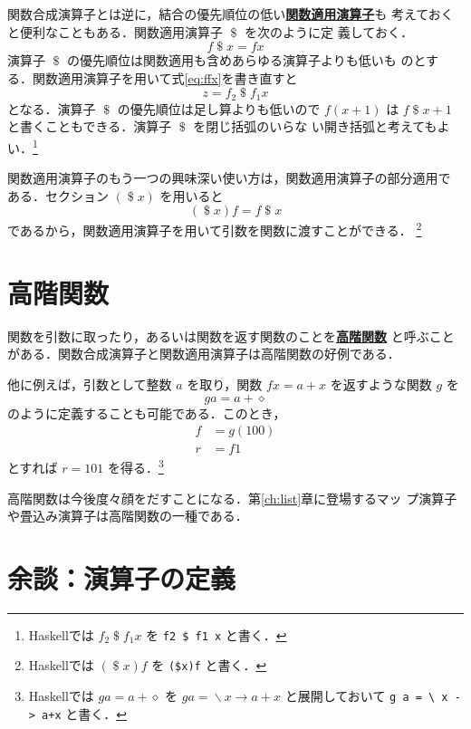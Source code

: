 \documentclass[a5paper,twoside,fleqn,draft]{jsbook}
\newcommand{\programminglanguage}[1]{\textsf{#1}}
\newcommand{\haskell}{\programminglanguage{Haskell}}
\newcommand{\keyword}[1]{{\underline{\textbf{#1}}}}
\newcommand{\code}[1]{\texttt{#1}}
\newcommand{\mAnonParam}{\diamond}
\DeclareMathOperator{\mApply}{\$}
\DeclareMathOperator{\mLambda}{\backslash}
\DeclareMathOperator{\mLambdaArrow}{\rightarrow}
\newcommand{\mLambdaEXP}[2]{\mLambda{#1}\mLambdaArrow{#2}} %
\begin{document}
関数合成演算子とは逆に，結合の優先順位の低い\keyword{関数適用演算子}も
考えておくと便利なこともある．関数適用演算子 $\mApply$ を次のように定
義しておく．
\begin{equation}
  f\mApply x
  =fx
\end{equation}
演算子 $\mApply$ の優先順位は関数適用も含めあらゆる演算子よりも低いも
のとする．関数適用演算子を用いて式\eqref{eq:ffx}を書き直すと
\begin{equation}
  z
  =f_2\mApply f_1x
\end{equation}
となる．演算子 $\mApply$ の優先順位は足し算よりも低いので $f(x+1)$ は
$f\mApply x+1$ と書くこともできる．演算子 $\mApply$ を閉じ括弧のいらな
い開き括弧と考えてもよい．\footnote{\haskell では $f_2\mApply f_1x$ を
  \code{f2 \$ f1 x} と書く．}

関数適用演算子のもう一つの興味深い使い方は，関数適用演算子の部分適用で
ある．セクション $(\mApply x)$ を用いると
\begin{equation}
  (\mApply x)f
  =f\mApply x
\end{equation}
であるから，関数適用演算子を用いて引数を関数に渡すことができる．
\footnote{\haskell では $(\mApply x)f$ を \code{(\$x)f} と書く．}

\section{高階関数}

関数を引数に取ったり，あるいは関数を返す関数のことを\keyword{高階関数}
と呼ぶことがある．関数合成演算子と関数適用演算子は高階関数の好例である．

他に例えば，引数として整数 $a$ を取り，関数 $fx=a+x$ を返すような関数
$g$ を
\begin{equation}
  ga
  =a+\mAnonParam
\end{equation}
のように定義することも可能である．このとき，
\begin{align}
  f
  &=g(100)\\
  r
  &=f1
\end{align}
とすれば $r=101$ を得る．\footnote{\haskell では $ga=a+\mAnonParam$ を
  $ga=\mLambdaEXP{x}{a+x}$ と展開しておいて \code{g a = \textbackslash
    x -> a+x} と書く．}

高階関数は今後度々顔をだすことになる．第\ref{ch:list}章に登場するマッ
プ演算子や畳込み演算子は高階関数の一種である．

\section{余談：演算子の定義}
\end{document}
